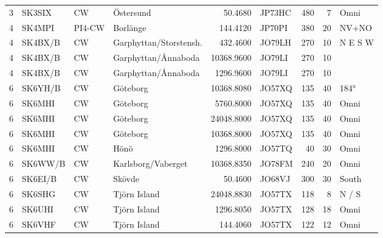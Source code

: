 \begin{landscape}
\begin{longtable}{rlllrlrrl}
	                 3 & SK3SIX     & CW      & Östersund              &      50.4680 & JP73HC      &      480 &        7 & Omni         \\
	                 4 & SK4MPI     & PI4-CW  & Borlänge               &     144.4120 & JP70PI      &      380 &       20 & NV+NO        \\
	                 4 & SK4BX/B    & CW      & Garphyttan/Storstensh. &     432.4600 & JO79LH      &      270 &       10 & N E S W      \\
	                 4 & SK4BX/B    & CW      & Garphyttan/Ånnaboda    &   10368.9600 & JO79LI      &      270 &       10 &              \\
	                 4 & SK4BX/B    & CW      & Garphyttan/Ånnaboda    &    1296.9600 & JO79LI      &      270 &       10 &              \\
	                 6 & SK6YH/B    & CW      & Göteborg               &   10368.8080 & JO57XQ      &      135 &       40 & 184°         \\
	                 6 & SK6MHI     & CW      & Göteborg               &    5760.8000 & JO57XQ      &      135 &       40 & Omni         \\
	                 6 & SK6MHI     & CW      & Göteborg               &   24048.8000 & JO57XQ      &      135 &       40 & Omni         \\
	                 6 & SK6MHI     & CW      & Göteborg               &   10368.8000 & JO57XQ      &      135 &       40 & Omni         \\
	                 6 & SK6MHI     & CW      & Hönö                   &    1296.8000 & JO57TQ      &       40 &       30 & Omni         \\
	                 6 & SK6WW/B    & CW      & Karlsborg/Vaberget     &   10368.8350 & JO78FM      &      240 &       20 & Omni         \\
	                 6 & SK6EI/B    & CW      & Skövde                 &      50.4600 & JO68VJ      &      300 &       30 & South        \\
	                 6 & SK6SHG     & CW      & Tjörn Island           &   24048.8830 & JO57TX      &      118 &        8 & N / S        \\
	                 6 & SK6UHI     & CW      & Tjörn Island           &    1296.8050 & JO57TX      &      128 &       18 & Omni         \\
	                 6 & SK6VHF     & CW      & Tjörn Island           &     144.4060 & JO57TX      &      122 &       12 & Omni         \\

\end{longtable}
\end{landscape}
